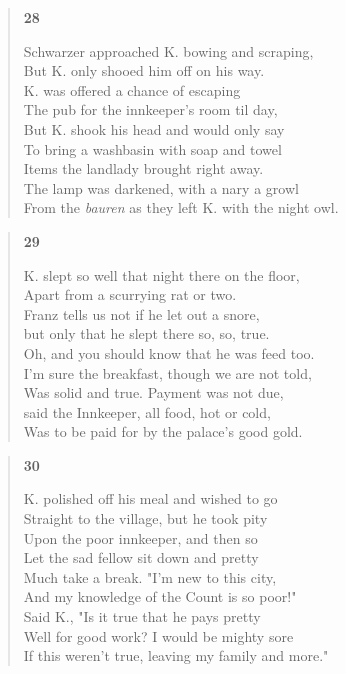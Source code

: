 \documentclass{article}
\begin{document}
\newpage

\begin{verse}
  \begin{center}
    \textbf{28} \\
  \end{center}
  Schwarzer approached K. bowing and scraping, \\
  But K. only shooed him off on his way. \\
  K. was offered a chance of escaping \\
  The pub for the innkeeper's room til day, \\
  But K. shook his head and would only say \\
  To bring a washbasin with soap and towel \\
  Items the landlady brought right away. \\
  The lamp was darkened, with a nary a growl \\
  From the \textit{bauren} as they left K. with the night owl.
\end{verse}

\begin{verse}
  \begin{center}
    \textbf{29} \\
  \end{center}
  K. slept so well that night there on the floor, \\
  Apart from a scurrying rat or two.\\
  Franz tells us not if he let out a snore, \\
  but only that he slept there so, so, true. \\
  Oh, and you should know that he was feed too. \\
  I'm sure the breakfast, though we are not told, \\
  Was solid and true. Payment was not due, \\
  said the Innkeeper, all food, hot or cold, \\
  Was to be paid for by the palace's good gold.
\end{verse}

\begin{verse}
  \begin{center}
    \textbf{30} \\
  \end{center}
  K. polished off his meal and wished to go \\
  Straight to the village, but he took pity \\
  Upon the poor innkeeper, and then so \\
  Let the sad fellow sit down and pretty \\
  Much take a break. "I'm new to this city, \\
  And my knowledge of the Count is so poor!" \\
  Said K., "Is it true that he pays pretty \\
  Well for good work? I would be mighty sore \\
  If this weren't true, leaving my family and more."
\end{verse}
\end{document}
